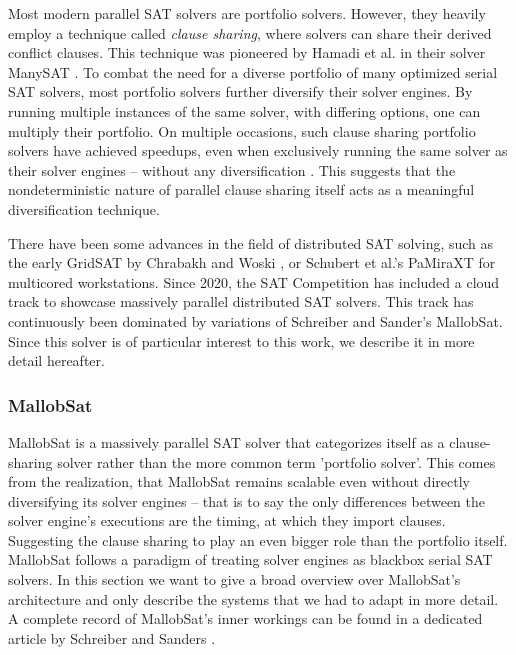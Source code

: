 \documentclass[12pt,a4paper,twoside]{scrartcl}
\numberwithin{equation}{section}
\begin{document}
Most modern parallel SAT solvers are portfolio solvers. However, they heavily employ a technique called \textit{clause sharing}, where solvers can share their derived conflict clauses. This technique was pioneered by Hamadi et al. in their solver ManySAT \cite{manySAT}. To combat the need for a diverse portfolio of many optimized serial SAT solvers, most portfolio solvers further diversify their solver engines. By running multiple instances of the same solver, with differing options, one can multiply their portfolio. On multiple occasions, such clause sharing portfolio solvers have achieved speedups, even when exclusively running the same solver as their solver engines -- without any diversification \cite{mallobSat, gimsatul}. This suggests that the nondeterministic nature of parallel clause sharing itself acts as a meaningful diversification technique.

There have been some advances in the field of distributed SAT solving, such as the early GridSAT by Chrabakh and Woski \cite{chrabakh2003gridsat}, or Schubert et al.'s PaMiraXT \cite{schubert2010pamiraxt} for multicored workstations. Since 2020, the SAT Competition has included a cloud track to showcase massively parallel distributed SAT solvers. This track has continuously been dominated by variations of Schreiber and Sander's MallobSat. Since this solver is of particular interest to this work, we describe it in more detail hereafter.

\subsubsection{MallobSat}

MallobSat \cite{mallobSat} is a massively parallel SAT solver that categorizes itself as a clause-sharing solver rather than the more common term 'portfolio solver'. This comes from the realization, that MallobSat remains scalable even without directly diversifying its solver engines -- that is to say the only differences between the solver engine's executions are the timing, at which they import clauses. Suggesting the clause sharing to play an even bigger role than the portfolio itself. MallobSat follows a paradigm of treating solver engines as blackbox serial SAT solvers. In this section we want to give a broad overview over MallobSat's architecture and only describe the systems that we had to adapt in more detail. A complete record of MallobSat's inner workings can be found in a dedicated article by Schreiber and Sanders \cite{mallobSat}.
\end{document}
